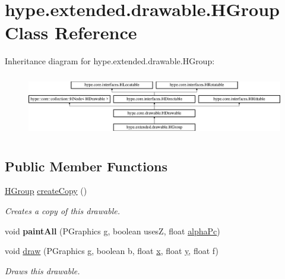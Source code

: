 \hypertarget{classhype_1_1extended_1_1drawable_1_1_h_group}{\section{hype.\-extended.\-drawable.\-H\-Group Class Reference}
\label{classhype_1_1extended_1_1drawable_1_1_h_group}
}
Inheritance diagram for hype.\-extended.\-drawable.\-H\-Group\-:\begin{figure}[H]
\begin{center}
\leavevmode
\includegraphics[height=2.745098cm]{classhype_1_1extended_1_1drawable_1_1_h_group}
\end{center}
\end{figure}
\subsection*{Public Member Functions}
\begin{DoxyCompactItemize}
\item 
\hyperlink{classhype_1_1extended_1_1drawable_1_1_h_group}{H\-Group} \hyperlink{classhype_1_1extended_1_1drawable_1_1_h_group_a39529ba2b7c9218e0d4dc1ab3aa6d8e4}{create\-Copy} ()
\begin{DoxyCompactList}\small\item\em Creates a copy of this drawable. \end{DoxyCompactList}\item 
\hypertarget{classhype_1_1extended_1_1drawable_1_1_h_group_a1a126a5752a33381c1e6cd1cb7a4d4e2}{void {\bfseries paint\-All} (P\-Graphics g, boolean uses\-Z, float \hyperlink{classhype_1_1core_1_1drawable_1_1_h_drawable_ad4f0e4c9f93d810c66b39f1715625719}{alpha\-Pc})}\label{classhype_1_1extended_1_1drawable_1_1_h_group_a1a126a5752a33381c1e6cd1cb7a4d4e2}

\item 
void \hyperlink{classhype_1_1extended_1_1drawable_1_1_h_group_ae82ac3e36ac85034812148f8c821afcf}{draw} (P\-Graphics g, boolean b, float \hyperlink{classhype_1_1core_1_1drawable_1_1_h_drawable_aecdbc8b9aa2e41f7e19d2b12f3f0d36e}{x}, float \hyperlink{classhype_1_1core_1_1drawable_1_1_h_drawable_ac7bcfc7a213f2b55cf8d0a6cd647442a}{y}, float f)
\begin{DoxyCompactList}\small\item\em Draws this drawable. \end{DoxyCompactList}\end{DoxyCompactItemize}
